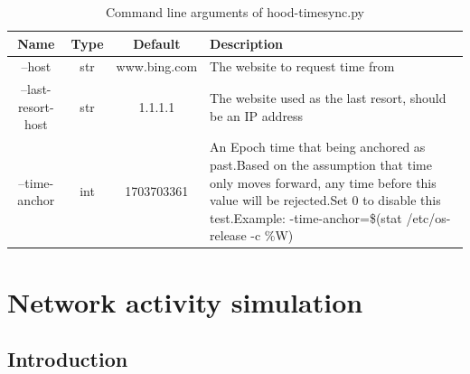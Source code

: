 \documentclass[mscthesis]{usiinfthesis}
\begin{document}
\begin{table}[H]
  \centering
  \begin{tabular}{|c|c|c|m{68mm}|}
    \hline
    Name               & Type & Default      & Description                                                                                                                                                                                                                                               \\
    \hline
    --host             & str  & www.bing.com & The website to request time from                                                                                                                                                                                                                          \\
    --last-resort-host & str  & 1.1.1.1      & The website used as the last resort, should be an IP address                                                                                                                                                                                              \\
    --time-anchor      & int  & 1703703361   & An Epoch time that being anchored as past.\newline Based on the assumption that time only moves forward, any time before this value will be rejected.\newline Set 0 to disable this test.\newline Example: -\-time-anchor=\$(stat /etc/os-release -c \%W) \\
    \hline
  \end{tabular}
  \caption{Command line arguments of hood-timesync.py}
  \label{tab:timesync_cmdarg}
\end{table}

\chapter{Network activity simulation}\label{cha:simulation}
\section{Introduction}
\end{document}
